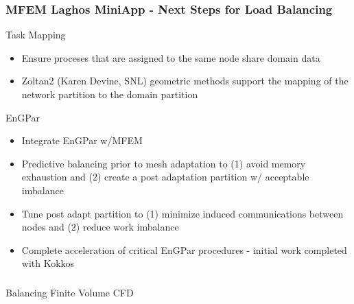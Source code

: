 \documentclass[aspectratio=169]{beamer}
\begin{document}
\begin{frame}
  \frametitle{MFEM Laghos MiniApp - Next Steps for Load Balancing}
  Task Mapping
  \begin{itemize}
    \item Ensure proceses that are assigned to the same node share domain data
    \item Zoltan2 (Karen Devine, SNL) geometric methods support the mapping of
      the network partition to the domain partition
  \end{itemize}
  EnGPar
  \begin{itemize}
    \item Integrate EnGPar w/MFEM
    \item Predictive balancing prior to mesh adaptation to (1) avoid memory 
      exhaustion and (2) create a post adaptation partition w/ acceptable imbalance
    \item Tune post adapt partition to (1) minimize induced communications between
      nodes and (2) reduce work imbalance
    \item Complete acceleration of critical EnGPar procedures - initial work
      completed with Kokkos
  \end{itemize}
\end{frame}

\begin{frame}
  \frametitle{}
  \center \huge{Balancing Finite Volume CFD}
\end{frame}
\end{document}
